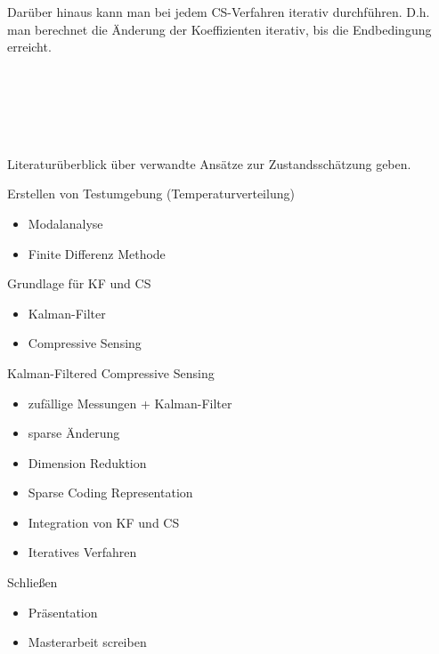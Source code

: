 \documentclass [a4paper, 10pt]{scrartcl}
\begin{document}
Darüber hinaus kann man bei jedem CS-Verfahren iterativ durchführen. D.h. man berechnet die Änderung der Koeffizienten iterativ, bis die Endbedingung erreicht. 
\\
\\
\\
\\
\\
\\

\begin{aufgaben}
\item Literaturüberblick über verwandte Ansätze zur Zustandsschätzung geben.
\item Erstellen von Testumgebung (Temperaturverteilung)
  \begin{itemize}
  \item Modalanalyse
  \item Finite Differenz Methode
  \end{itemize}
\item Grundlage für KF und CS
  \begin{itemize}
  \item Kalman-Filter
  \item Compressive Sensing
  \end{itemize}
\item Kalman-Filtered Compressive Sensing
  \begin{itemize}
  \item zufällige Messungen + Kalman-Filter
  \item sparse Änderung
  \item Dimension Reduktion
  \item Sparse Coding Representation
  \item Integration von KF und CS
  \item Iteratives Verfahren
  \end{itemize}
\item Schließen
  \begin{itemize}
  \item Präsentation
  \item Masterarbeit screiben
  \end{itemize}
\end{aufgaben}%
\Ende
\end{document}
